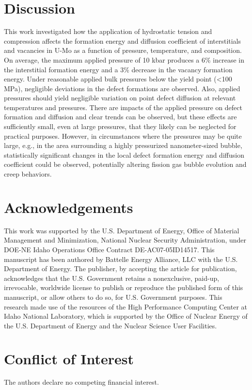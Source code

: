 \documentclass[default]{sn-jnl}%
\begin{document}
\section{Discussion}\label{sec4}
This work investigated how the application of hydrostatic tension and compression affects the formation energy and diffusion coefficient of interstitials and vacancies in U-Mo as a function of pressure, temperature, and composition. On average, the maximum applied pressure of 10 kbar produces a 6\% increase in the interstitial formation energy and a 3\% decrease in the vacancy formation energy. Under reasonable applied bulk pressures below the yield point (<100 MPa), negligible deviations in the defect formations are observed. Also, applied pressures should yield negligible variation on point defect diffusion at relevant temperatures and pressures. There are impacts of the applied pressure on defect formation and diffusion and clear trends can be observed, but these effects are sufficiently small, even at large pressures, that they likely can be neglected for practical purposes. However, in circumstances where the pressures may be quite large, e.g., in the area surrounding a highly pressurized nanometer-sized bubble, statistically significant changes in the local defect formation energy and diffusion coefficient could be observed, potentially altering fission gas bubble evolution and creep behaviors.

\section{Acknowledgements}\label{sec5}
This work was supported by the U.S. Department of Energy, Office of Material Management and Minimization, National Nuclear Security Administration, under DOE-NE Idaho Operations Office Contract DE-AC07-05ID14517. This manuscript has been authored by Battelle Energy Alliance, LLC with the U.S. Department of Energy. The publisher, by accepting the article for publication, acknowledges that the U.S. Government retains a nonexclusive, paid-up, irrevocable, worldwide license to publish or reproduce the published form of this manuscript, or allow others to do so, for U.S. Government purposes. This research made use of the resources of the High Performance Computing Center at Idaho National Laboratory, which is supported by the Office of Nuclear Energy of the U.S. Department of Energy and the Nuclear Science User Facilities.

\section{Conflict of Interest}\label{sec6}
The authors declare no competing financial interest.




\end{document}
